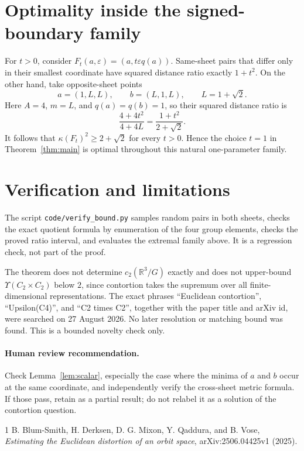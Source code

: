 \documentclass[11pt]{article}
\newcommand{\R}{\mathbb R}
\newcommand{\Vfour}{C_2\times C_2}
\begin{document}
\section{Optimality inside the signed-boundary family}

For $t>0$, consider $F_t(a,\varepsilon)=(a,t\varepsilon q(a))$.
Same-sheet pairs that differ only in their smallest coordinate have squared
distance ratio exactly $1+t^2$. On the other hand, take opposite-sheet points
\[
a=(1,L,L),\qquad b=(L,1,L),\qquad L=1+\sqrt2.
\]
Here $A=4$, $m=L$, and $q(a)=q(b)=1$, so their squared distance ratio is
\[
\frac{4+4t^2}{4+4L}=\frac{1+t^2}{2+\sqrt2}.
\]
It follows that $\kappa(F_t)^2\geq2+\sqrt2$ for every $t>0$. Hence the choice
$t=1$ in Theorem~\ref{thm:main} is optimal throughout this natural
one-parameter family.

\section{Verification and limitations}

The script \texttt{code/verify\_bound.py} samples random pairs in both sheets,
checks the exact quotient formula by enumeration of the four group elements,
checks the proved ratio interval, and evaluates the extremal family above.
It is a regression check, not part of the proof.

The theorem does not determine $c_2(\R^3/G)$ exactly and does not upper-bound
$\Upsilon(\Vfour)$ below $2$, since contortion takes the supremum over all
finite-dimensional representations. The exact phrases ``Euclidean
contortion'', ``Upsilon(C4)'', and ``C2 times C2'', together with the paper
title and arXiv id, were searched on 27 August 2026. No later resolution or
matching bound was found. This is a bounded novelty check only.

\paragraph{Human review recommendation.}
Check Lemma~\ref{lem:scalar}, especially the case where the minima of $a$ and
$b$ occur at the same coordinate, and independently verify the cross-sheet
metric formula. If those pass, retain as a partial result; do not relabel it as
a solution of the contortion question.

\begin{thebibliography}{1}
B. Blum-Smith, H. Derksen, D. G. Mixon, Y. Qaddura, and B. Vose,
\emph{Estimating the Euclidean distortion of an orbit space},
arXiv:2506.04425v1 (2025).
\end{thebibliography}
\end{document}
